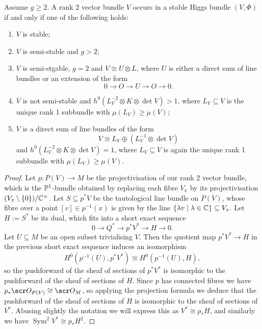 \documentclass[A4paper, 12pt, british, reqno]{amsart}
\DeclareMathOperator{\Sym}{Sym}
\newcommand{\ot}{\otimes}
\newcommand{\op}{\oplus}
\newcommand{\dual}{^{*}}
\begin{document}
\begin{prop}
    Assume $g\geqslant 2$.
    A rank $2$ vector bundle $V$ occurs in a stable Higgs bundle $(V,\Phi)$ if and only if one of the following holds:
    \begin{enumerate}[label=\roman*)]
	\item $V$ is stable;
	\item $V$ is semi-stable and $g>2$;
	\item $V$ is semi-stgable, $g=2$ and $V\cong U\ot L$, where $U$ is either a direct sum of line bundles or an extension of the form
	    \[ 0\to O\to U\to O\to 0. \]
	\item $V$ is not semi-stable and $h^{0}(L_{V}^{-2}\ot K\ot \det{V})>1$, where $L_{V}\subseteq V$ is the unique rank 1 subbundle with $\mu(L_{V})\geqslant \mu(V)$;
	\item $V$ is a direct sum of line bundles of the form
	    \[ V\cong L_{V}\op (L_{V}^{-1}\ot \det{V}) \]
	    and $h^{0}(L_{V}^{-2}\ot K\ot \det{V})=1$, where $L_{V}\subseteq V$ is again the unique rank 1 subbundle with $\mu(L_{V})\geqslant \mu(V)$.
    \end{enumerate}
    \begin{proof}
	Let $p\colon P(V)\to M$ be the projectivisation of our rank 2 vector bundle, which is the $\P^{1}$-bundle obtained by replacing each fibre $V_{x}$ by its projectivisation $(V_{x}\setminus \{0\})/\C^{\times}$.
	Let $S\subseteq p^{*}V$ be the tautological line bundle on $P(V)$, whose fibre over a point $[v]\in p^{-1}(x)$ is given by the line $\{ \lambda v \mid \lambda \in \C \}\subseteq V_{x}$.
	Let $H:=S\dual$ be its dual, which fits into a short exact sequence
	\[ 0\to Q\dual \to p^{*}V\dual \to H \to 0. \]
	Let $U\subseteq M$ be an open subset trivialising $V$.
	Then the quotient map $p^{*}V\dual \to H$ in the previous short exact sequence induces an isomorphism
	\[ H^{0}(p^{-1}(U),p^{*}V\dual)\cong H^{0}(p^{-1}(U),H), \]
	so the pushforward of the sheaf of sections of $p^{*}V\dual$ is isomorphic to the pushforward of the sheaf of sections of $H$.
	Since $p$ has connected fibres we have $p_{*}\O_{P(V)}\cong \O_{M}$, so applying the projection formula \cite[Exercise II.5.1.d]{har77} we deduce that the pushforward of the sheaf of sections of $H$ is isomorphic to the sheaf of sections of $V\dual$.
	Abusing slightly the notation we will express this as $V\dual \cong p_{*}H$, and similarly we have $\Sym^{2}V\dual\cong p_{*}H^{2}$.


\end{proof}
\end{prop}
\end{document}
